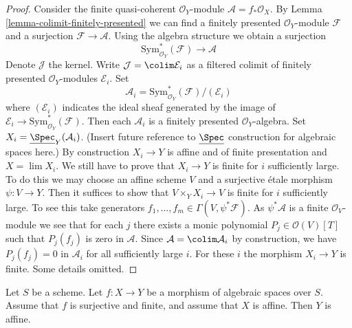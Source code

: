 \begin{proof}
Consider the finite quasi-coherent $\mathcal{O}_Y$-module
$\mathcal{A} = f_*\mathcal{O}_X$. By
Lemma \ref{lemma-colimit-finitely-presented}
we can find a finitely presented $\mathcal{O}_Y$-module
$\mathcal{F}$ and a surjection $\mathcal{F} \to \mathcal{A}$.
Using the algebra structure we obtain a surjection
$$
\text{Sym}^*_{\mathcal{O}_Y}(\mathcal{F}) \longrightarrow \mathcal{A}
$$
Denote $\mathcal{J}$ the kernel. Write $\mathcal{J} = \colim \mathcal{E}_i$
as a filtered colimit of finitely presented $\mathcal{O}_Y$-modules
$\mathcal{E}_i$. Set
$$
\mathcal{A}_i = \text{Sym}^*_{\mathcal{O}_Y}(\mathcal{F})/(\mathcal{E}_i)
$$
where $(\mathcal{E}_i)$ indicates the ideal sheaf generated by
the image of $\mathcal{E}_i \to \text{Sym}^*_{\mathcal{O}_Y}(\mathcal{F})$.
Then each $\mathcal{A}_i$ is a finitely presented $\mathcal{O}_Y$-algebra.
Set $X_i = \underline{\Spec}_Y(\mathcal{A}_i)$. (Insert future reference to
$\underline{\Spec}$ construction for algebraic spaces here.)
By construction $X_i \to Y$ is affine and of finite presentation
and $X = \lim X_i$. We still have to prove that $X_i \to Y$ is finite
for $i$ sufficiently large. To do this we may choose an affine scheme
$V$ and a surjective \'etale morphism $\psi : V \to Y$.
Then it suffices to show that $V \times_Y X_i \to V$ is finite
for $i$ sufficiently large. To see this take generators
$f_1, \ldots, f_m \in \Gamma(V, \psi^*\mathcal{F})$.
As $\psi^*\mathcal{A}$ is a finite $\mathcal{O}_V$-module we
see that for each $j$ there exists a monic polynomial
$P_j \in \mathcal{O}(V)[T]$ such that $P_j(f_j)$ is zero in $\mathcal{A}$.
Since $\mathcal{A} = \colim \mathcal{A}_i$ by construction, we
have $P_j(f_j) = 0$ in $\mathcal{A}_i$ for all sufficiently large $i$.
For these $i$ the morphism $X_i \to Y$ is finite. Some details omitted.
\end{proof}

\begin{lemma}
\label{lemma-affine}
Let $S$ be a scheme. Let $f : X \to Y$ be a morphism of algebraic spaces
over $S$. Assume that $f$ is surjective and finite, and assume that $X$
is affine. Then $Y$ is affine.
\end{lemma}

